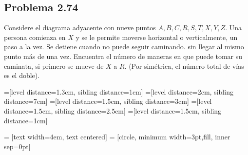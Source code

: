 \documentclass[12pt]{article}
\begin{document}

\subsection*{Problema 2.74}

Considere el diagrama adyacente con nueve puntos $A, B, C, R, S, T, X, Y, Z$.
Una persona comienza en $X$ y se le permite moverse horizontal o verticalmente,
un paso a la vez. Se detiene cuando no puede seguir caminando. sin llegar al
mismo punto más de una vez. Encuentra el número de maneras en que puede tomar su
caminata, si primero se mueve de $X$ a $R$. (Por simétrica, el número total de
vías es el doble).


=[level distance=1.3cm, sibling distance=1cm]
=[level distance=2cm, sibling distance=7cm]
=[level distance=1.5cm, sibling distance=3cm]
=[level distance=1.5cm, sibling distance=2.5cm]
=[level distance=1.5cm, sibling distance=1cm]

 = [text width=4em, text centered]
 = [circle, minimum width=3pt,fill, inner sep=0pt]
\end{document}
